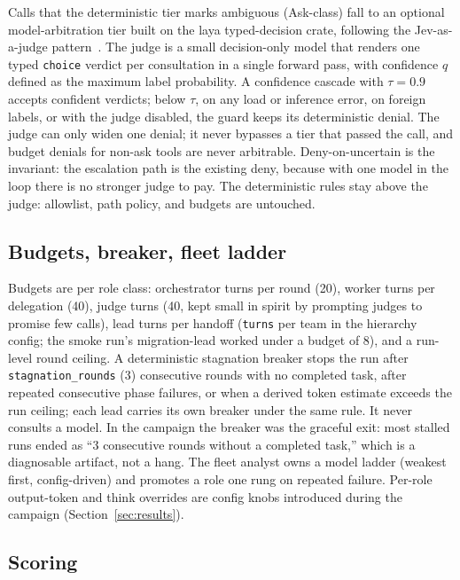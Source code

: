 \documentclass[11pt]{article}
\begin{document}
Calls that the deterministic tier marks ambiguous (Ask-class) fall to
an optional model-arbitra\-tion tier built on the laya typed-decision
crate,
following the Jev-as-a-judge pattern~\cite{li2026jevjudge}. The judge is
a small decision-only model that renders one typed \texttt{choice}
verdict per consultation in a single forward pass, with confidence $q$
defined as the maximum label probability. A confidence cascade with
$\tau = 0.9$ accepts confident verdicts; below $\tau$, on any load or
inference error, on foreign labels, or with the judge disabled, the
guard keeps its deterministic denial. The judge can only widen one
denial; it never bypasses a tier that passed the call, and budget
denials for non-ask tools are never arbitrable. Deny-on-uncertain is
the invariant: the escalation path is the existing deny, because with
one model in the loop there is no stronger judge to pay. The
deterministic rules stay above the judge: allowlist, path policy, and
budgets are untouched.

\subsection{Budgets, breaker, fleet ladder}

Budgets are per role class: orchestrator turns per round (20), worker
turns per delegation (40), judge turns (40, kept small in spirit by
prompting judges to promise few calls), lead turns per handoff
(\texttt{turns} per team in the hierarchy config; the smoke run's
migration-lead worked under a budget of 8), and a
run-level round ceiling. A deterministic stagnation breaker stops the run
after \texttt{stagnation\_rounds} (3) consecutive rounds with no completed
task, after repeated consecutive phase failures, or when a derived token
estimate exceeds the run ceiling; each lead carries its own breaker
under the same rule. It never consults a model. In the
campaign the breaker was the graceful exit: most stalled runs ended as
``3 consecutive rounds without a completed task,'' which is a diagnosable
artifact, not a hang. The fleet analyst owns a model ladder (weakest
first, config-driven) and promotes a role one rung on repeated failure.
Per-role output-token and think overrides are config knobs introduced
during the campaign (Section~\ref{sec:results}).

\subsection{Scoring}
\label{sec:scoring}
\end{document}
